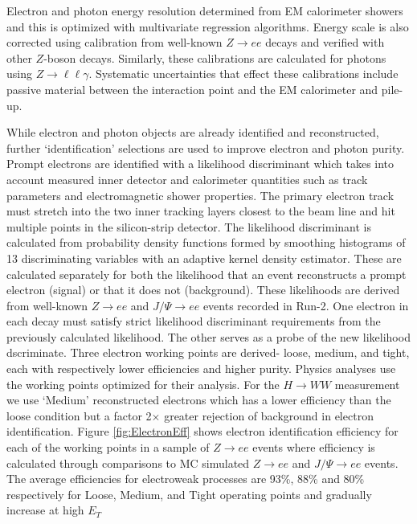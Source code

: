 Electron and photon energy resolution determined from EM calorimeter showers and this is optimized with multivariate regression algorithms. Energy scale is also corrected using calibration from well-known $Z\rightarrow ee$ decays and verified with other $Z$-boson decays. Similarly, these calibrations are calculated for photons using $Z\rightarrow \ell\ell\gamma$. Systematic uncertainties that effect these calibrations include passive material between the interaction point and the EM calorimeter and pile-up. 

While electron and photon objects are already identified and reconstructed, further `identification' selections are used to improve electron and photon purity. Prompt electrons are identified with a likelihood discriminant which takes into account measured inner detector and calorimeter quantities such as track parameters and electromagnetic shower properties. The primary electron track must stretch into the two inner tracking layers closest to the beam line and hit multiple points in the silicon-strip detector. The likelihood discriminant is calculated from probability density functions formed by smoothing histograms of 13 discriminating variables with an adaptive kernel density estimator.  These are calculated separately for both the likelihood that an event reconstructs a prompt electron (signal) or that it does not (background). These likelihoods are derived from well-known $Z\rightarrow ee$ and $J/\Psi\rightarrow ee$ events recorded in Run-2. One electron in each decay must satisfy strict likelihood discriminant requirements from the previously calculated likelihood. The other serves as a probe of the new likelihood dscriminate. Three electron working points are derived- loose, medium, and tight, each with respectively lower efficiencies and higher purity. Physics analyses use the working points optimized for their analysis. For the $H\rightarrow WW$ measurement we use `Medium' reconstructed electrons which has a lower efficiency than the loose condition but a factor 2$\times$ greater rejection of background in electron identification. Figure \ref{fig:ElectronEff} shows electron identification efficiency for each of the working points in a sample of $Z\rightarrow ee$ events where efficiency is calculated through comparisons to MC simulated $Z\rightarrow ee$ and $J/\Psi\rightarrow ee$ events. The average efficiencies for electroweak processes are 93\%, 88\% and 80\% respectively for Loose, Medium, and Tight operating points and gradually increase at high $E_T$


